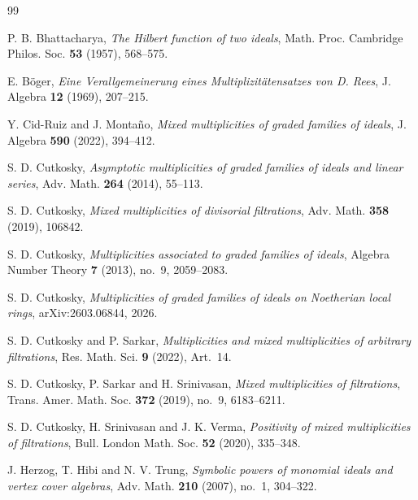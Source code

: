\documentclass[reqno,12pt]{amsart}
\theoremstyle{plain}
\theoremstyle{definition}
\theoremstyle{remark}
\numberwithin{equation}{section}
\begin{document}
\begin{thebibliography}{99}

P. B. Bhattacharya,
\emph{The Hilbert function of two ideals},
Math. Proc. Cambridge Philos. Soc. \textbf{53} (1957), 568--575.

E. B\"oger,
\emph{Eine Verallgemeinerung eines Multiplizit\"atensatzes von D. Rees},
J. Algebra \textbf{12} (1969), 207--215.


Y. Cid-Ruiz and J. Monta\~no,
\emph{Mixed multiplicities of graded families of ideals},
J. Algebra \textbf{590} (2022), 394--412.

S. D. Cutkosky,
\emph{Asymptotic multiplicities of graded families of ideals and linear
series},
Adv. Math. \textbf{264} (2014), 55--113.

S. D. Cutkosky,
\emph{Mixed multiplicities of divisorial filtrations},
Adv. Math. \textbf{358} (2019), 106842.

S. D. Cutkosky,
\emph{Multiplicities associated to graded families of ideals},
Algebra Number Theory \textbf{7} (2013), no.~9, 2059--2083.


S. D. Cutkosky,
\emph{Multiplicities of graded families of ideals on Noetherian local rings},
arXiv:2603.06844, 2026.

S. D. Cutkosky and P. Sarkar,
\emph{Multiplicities and mixed multiplicities of arbitrary filtrations},
Res. Math. Sci. \textbf{9} (2022), Art.~14.

S. D. Cutkosky, P. Sarkar and H. Srinivasan,
\emph{Mixed multiplicities of filtrations},
Trans. Amer. Math. Soc. \textbf{372} (2019), no.~9, 6183--6211.

S. D. Cutkosky, H. Srinivasan and J. K. Verma,
\emph{Positivity of mixed multiplicities of filtrations},
Bull. London Math. Soc. \textbf{52} (2020), 335--348.

J. Herzog, T. Hibi and N. V. Trung,
\emph{Symbolic powers of monomial ideals and vertex cover algebras},
Adv. Math. \textbf{210} (2007), no.~1, 304--322.


\end{thebibliography}
\end{document}
